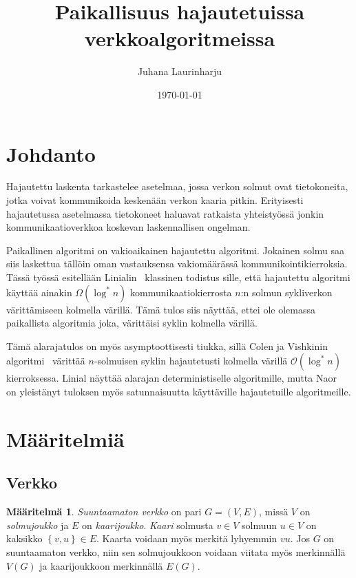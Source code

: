 \documentclass[finnish]{tktltiki2}
\title{Paikallisuus hajautetuissa verkkoalgoritmeissa}
\author{Juhana Laurinharju}
\date{\today}
\theoremstyle{definition}
\newtheorem{maar}[lau]{Määritelmä}
\theoremstyle{remark}
\newcommand{\set}[1]{\left\{ #1 \right\}}
\begin{document}

\maketitle        %
\makeabstract     %

\tableofcontents  %
\newpage          %



\section{Johdanto}

Hajautettu laskenta tarkastelee asetelmaa, jossa verkon solmut ovat
tietokoneita, jotka voivat kommunikoida keskenään verkon kaaria pitkin.
Erityisesti hajautetussa asetelmassa tietokoneet haluavat ratkaista
yhteistyössä jonkin kommunikaatioverkkoa koskevan laskennallisen ongelman.

Paikallinen algoritmi on vakioaikainen hajautettu algoritmi. Jokainen solmu saa
siis laskettua tällöin oman vastauksensa vakiomäärässä kommunikointikierroksia.
Tässä työssä esitellään Linialin~\cite{linial92} klassinen todistus sille, että
hajautettu algoritmi käyttää ainakin $\Omega(\log^* n)$ kommunikaatiokierrosta
$n$:n solmun sykliverkon värittämiseen kolmella värillä. Tämä tulos siis
näyttää, ettei ole olemassa paikallista algoritmia joka, värittäisi syklin
kolmella värillä.

Tämä alarajatulos on myös asymptoottisesti tiukka, sillä Colen ja Vishkinin
algoritmi~\cite{colevishkin86} värittää $n$-solmuisen syklin hajautetusti
kolmella värillä $\mathcal{O}(\log^* n)$ kierroksessa. Linial näyttää alarajan
deterministiselle algoritmille, mutta Naor~\cite{naor91} on yleistänyt tuloksen
myös satunnaisuutta käyttäville hajautetuille algoritmeille.

\section{Määritelmiä}

\subsection{Verkko}

\begin{maar}
    \emph{Suuntaamaton verkko} on pari $G = (V,E)$, missä $V$ on
    \emph{solmujoukko} ja $E$ on \emph{kaarijoukko}. \emph{Kaari} solmusta $v
    \in V$ solmuun $u \in V$ on kaksikko $\set{v,u} \in E$. Kaarta voidaan myös
    merkitä lyhyemmin $vu$. Jos $G$ on suuntaamaton verkko, niin sen
    solmujoukkoon voidaan viitata myös merkinnällä $V(G)$ ja kaarijoukkoon
    merkinnällä $E(G)$.
\end{maar}
\end{document}
